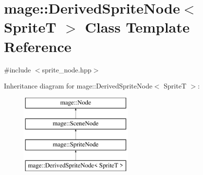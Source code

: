 \hypertarget{classmage_1_1_derived_sprite_node}{}\section{mage\+:\+:Derived\+Sprite\+Node$<$ SpriteT $>$ Class Template Reference}
\label{classmage_1_1_derived_sprite_node}


{\ttfamily \#include $<$sprite\+\_\+node.\+hpp$>$}

Inheritance diagram for mage\+:\+:Derived\+Sprite\+Node$<$ SpriteT $>$\+:\begin{figure}[H]
\begin{center}
\leavevmode
\includegraphics[height=4.000000cm]{classmage_1_1_derived_sprite_node}
\end{center}
\end{figure}
